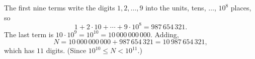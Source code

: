 The first nine terms write the digits $1,2,\ldots,9$ into the units, tens, $\ldots$, $10^8$ places, so
\[1+2\cdot10+\cdots+9\cdot10^8=987\,654\,321 .\]
The last term is $10\cdot10^9=10^{10}=10\,000\,000\,000$. Adding,
\[N=10\,000\,000\,000+987\,654\,321=10\,987\,654\,321,\]
which has $\boxed{11}$ digits. (Since $10^{10}\le N<10^{11}$.)
